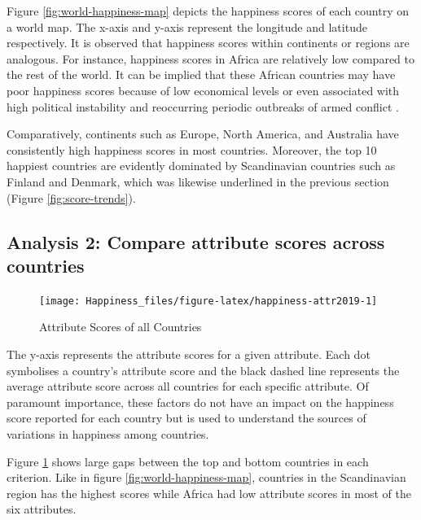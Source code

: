 \documentclass[11pt,a4paper,]{article}
\begin{document}
Figure \ref{fig:world-happiness-map} depicts the happiness scores of each country on a world map. The x-axis and y-axis represent the longitude and latitude respectively. It is observed that happiness scores within continents or regions are analogous. For instance, happiness scores in Africa are relatively low compared to the rest of the world. It can be implied that these African countries may have poor happiness scores because of low economical levels or even associated with high political instability and reoccurring periodic outbreaks of armed conflict \autocite{sachs2018world}.

Comparatively, continents such as Europe, North America, and Australia have consistently high happiness scores in most countries. Moreover, the top 10 happiest countries are evidently dominated by Scandinavian countries such as Finland and Denmark, which was likewise underlined in the previous section (Figure \ref{fig:score-trends}).

\clearpage

\hypertarget{analysis-2-compare-attribute-scores-across-countries}{%
\subsection{Analysis 2: Compare attribute scores across countries}\label{analysis-2-compare-attribute-scores-across-countries}}

\begin{figure}

{\centering \texttt{[image: Happiness\_files/figure-latex/happiness-attr2019-1]} 

}

\caption{Attribute Scores of all Countries}\label{fig:happiness-attr2019}
\end{figure}

The y-axis represents the attribute scores for a given attribute. Each dot symbolises a country's attribute score and the black dashed line represents the average attribute score across all countries for each specific attribute. Of paramount importance, these factors do not have an impact on the happiness score reported for each country but is used to understand the sources of variations in happiness among countries.

Figure \ref{fig:happiness-attr2019} shows large gaps between the top and bottom countries in each criterion. Like in figure \ref{fig:world-happiness-map}, countries in the Scandinavian region has the highest scores while Africa had low attribute scores in most of the six attributes.
\end{document}
